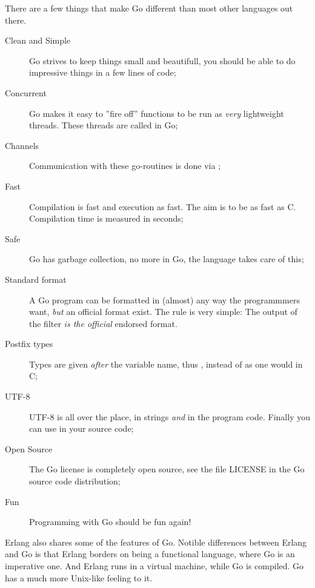 \noindent{}There are a few things that make Go different than most other
languages out there.
\begin{description}
\item[Clean and Simple]
Go strives to keep things small and beautifull, you should
be able to do impressive things in a few lines of code;
\item[Concurrent]
Go makes it easy to ''fire off'' functions to be
run as \emph{very} lightweight threads. These threads are called
 in Go;

\item[Channels] 
Communication with these go-routines is done
via  \cite{csp}\cite{hoare};

\item[Fast]
Compilation is fast and execution as fast. The aim is
to be as fast as C. Compilation time is measured in seconds;

\item[Safe]
Go has garbage collection, no more  in Go,
the language takes care of this;

\item[Standard format]
A Go program can be formatted in (almost) any way the programmmers want,
\emph{but} an official format exist. The rule is very simple:
The output of the filter  \emph{is the official} endorsed
format.

\item[Postfix types]
Types are given \emph{after} the variable name, thus ,
instead of  as one would in C;

\item[UTF-8]
UTF-8 is all over the place, in strings
\emph{and} in the program code. Finally you can use  in your source code;

\item[Open Source]
The Go license is completely open source, see the file LICENSE in the Go
source code distribution;

\item[Fun]
Programming with Go should be fun again!

\end{description}
Erlang \cite{erlang} also shares some
of the features of Go. Notible differences between Erlang
and Go is that Erlang borders on being a functional language,
where Go is an imperative one. And Erlang runs in a virtual
machine, while Go is compiled. Go has a much more Unix-like
feeling to it.

